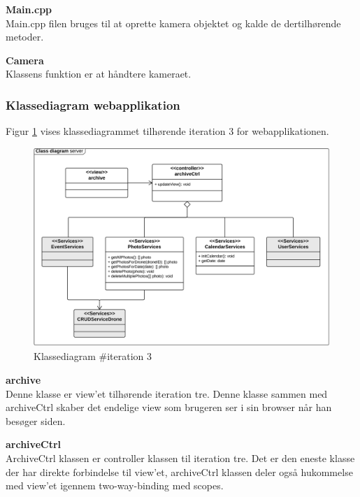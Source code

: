 \textbf{Main.cpp} \\
Main.cpp filen bruges til at oprette kamera objektet og kalde de dertilhørende metoder.

\textbf{Camera} \\
Klassens funktion er at håndtere kameraet.

\newpage

\subsubsection*{Klassediagram webapplikation}

Figur \ref{fig:classDiagram_iteration3} vises klassediagrammet tilhørende iteration 3 for webapplikationen. 

\begin{figure}[H]
	\centering
	\includegraphics[width=1\textwidth]{Billeder/klasse_diagrammer/classdiagram_iteration3_server.png}
	\vspace{-0.5cm}
	\caption{Klassediagram \#iteration 3}
	\label{fig:classDiagram_iteration3}
\end{figure}

\textbf{archive}\\
Denne klasse er view'et tilhørende iteration tre. Denne klasse sammen med archiveCtrl skaber det endelige view som brugeren ser i sin browser når han besøger siden.

\textbf{archiveCtrl}\\
ArchiveCtrl klassen er controller klassen til iteration tre. Det er den eneste klasse der har direkte forbindelse til view'et, archiveCtrl klassen deler også hukommelse med view'et igennem two-way-binding med scopes.

